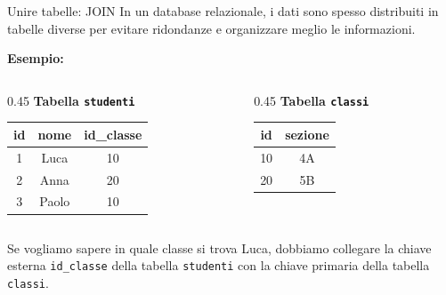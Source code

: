 \documentclass{beamer}
\begin{document}
\begin{frame}[fragile]{Unire tabelle: JOIN}
In un database relazionale, i dati sono spesso distribuiti in tabelle diverse per evitare ridondanze e organizzare meglio le informazioni.

\medskip
\textbf{Esempio:}
\begin{columns}
\begin{column}{0.45\textwidth}
\centering
\textbf{Tabella \texttt{studenti}}
\begin{tabular}{|c|c|c|}
\hline
\textbf{id} & \textbf{nome} & \textbf{id\_classe} \\ \hline
1 & Luca & 10 \\ \hline
2 & Anna & 20 \\ \hline
3 & Paolo & 10 \\ \hline
\end{tabular}
\end{column}
\begin{column}{0.45\textwidth}
\centering
\textbf{Tabella \texttt{classi}}
\begin{tabular}{|c|c|}
\hline
\textbf{id} & \textbf{sezione} \\ \hline
10 & 4A \\ \hline
20 & 5B \\ \hline
\end{tabular}
\end{column}
\end{columns}

\bigskip
Se vogliamo sapere in quale classe si trova Luca, dobbiamo collegare la chiave esterna \texttt{id\_classe} della tabella \texttt{studenti} con la chiave primaria della tabella \texttt{classi}.
\end{frame}

\end{document}
